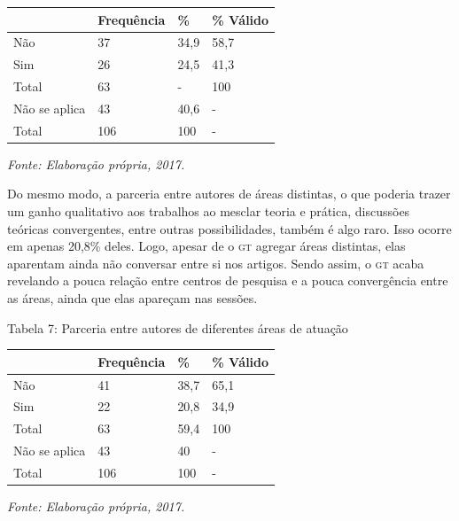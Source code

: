 \begin{center}
\centering
\begin{tabular}{|l|l|l|l|}
\hline
 & \textbf{Frequência} & \textbf{\%} & \textbf{\% Válido} \\ \hline
Não & 37 & 34,9 & 58,7 \\ \hline
Sim & 26 & 24,5 & 41,3 \\ \hline
Total & 63 & - & 100 \\ \hline
Não se aplica & 43 & 40,6 & - \\ \hline
Total & 106 & 100 & - \\ \hline
\end{tabular}
\end{center}

\begin{center}
{\footnotesize\emph{Fonte: Elaboração própria, 2017.}}
\end{center}

Do mesmo modo, a parceria entre autores de áreas distintas, o que
poderia trazer um ganho qualitativo aos trabalhos ao mesclar teoria e
prática, discussões teóricas convergentes, entre outras possibilidades,
também é algo raro. Isso ocorre em apenas 20,8\% deles. Logo, apesar de
o \textsc{gt} agregar áreas distintas, elas aparentam ainda não conversar entre
si nos artigos. Sendo assim, o \textsc{gt} acaba revelando a pouca relação entre
centros de pesquisa e a pouca convergência entre as áreas, ainda que
elas apareçam nas sessões.

\pagebreak
\begin{center}
Tabela 7: Parceria entre autores de diferentes áreas de atuação
\end{center}

\begin{center}
\begin{tabular}{|l|l|l|l|}
\hline
 & \textbf{Frequência} & \textbf{\%} & \textbf{\% Válido} \\ \hline
Não & 41 & 38,7 & 65,1 \\ \hline
Sim & 22 & 20,8 & 34,9 \\ \hline
Total & 63 & 59,4 & 100 \\ \hline
Não se aplica & 43 & 40 & - \\ \hline
Total & 106 & 100 & - \\ \hline
\end{tabular}
\end{center}

\begin{center}
{\footnotesize\emph{Fonte: Elaboração própria, 2017.}}
\end{center}

